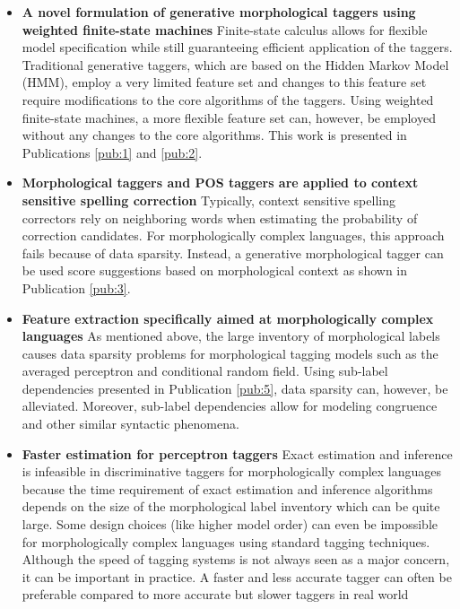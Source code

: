 \begin{itemize}
\item {\bf A novel formulation of generative morphological taggers
    using weighted finite-state machines} Finite-state calculus allows
  for flexible model specification while still guaranteeing efficient
  application of the taggers. Traditional generative taggers, which
  are based on the Hidden Markov Model (HMM), employ a very limited
  feature set and changes to this feature set require modifications to
  the core algorithms of the taggers. Using weighted finite-state
  machines, a more flexible feature set can, however, be employed
  without any changes to the core algorithms. This work is presented
  in Publications \ref{pub:1} and \ref{pub:2}.
\item {\bf Morphological taggers and POS taggers are applied to context
  sensitive spelling correction} Typically, context sensitive spelling
  correctors rely on neighboring words when estimating the probability
  of correction candidates. For morphologically complex languages, this
  approach fails because of data sparsity. Instead, a generative
  morphological tagger can be used score suggestions based on
  morphological context as shown in Publication \ref{pub:3}.
\item {\bf Feature extraction specifically aimed at morphologically
    complex languages} As mentioned above, the large inventory of
  morphological labels causes data sparsity problems for morphological
  tagging models such as the averaged perceptron and conditional
  random field. Using sub-label dependencies presented in Publication \ref{pub:5},
  data sparsity can, however, be alleviated. Moreover, sub-label
  dependencies allow for modeling congruence and other similar
  syntactic phenomena.
\item {\bf Faster estimation for perceptron taggers} Exact estimation
  and inference is infeasible in discriminative taggers for
  morphologically complex languages because the time requirement of exact
  estimation and inference algorithms depends on the size of the
  morphological label inventory which can be quite large. Some design
  choices (like higher model order) can even be impossible for
  morphologically complex languages using standard tagging
  techniques. Although the speed of tagging systems is not always seen
  as a major concern, %
  it can be important in practice.
A faster and less accurate tagger can often be
  preferable compared to more accurate but slower taggers in real world

\end{itemize}
